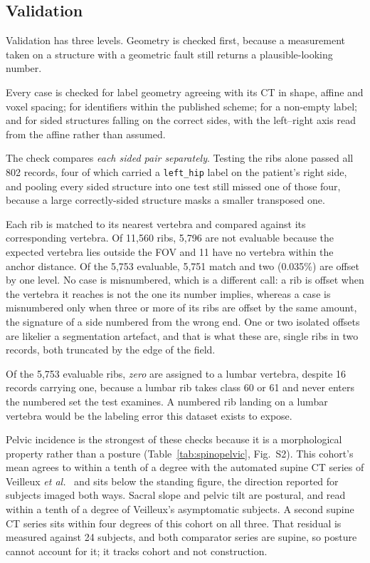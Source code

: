 \documentclass[aapm,mph,amsmath,amssymb,preprint,linenumbers]{revtex4-2}
\begin{document}
\subsection{Validation}
\label{sec:validation}


Validation has three levels. Geometry is checked first, because a measurement taken on a
structure with a geometric fault still returns a plausible-looking number.

Every case is checked for label geometry agreeing with its CT in
shape, affine and voxel spacing; for identifiers within the published scheme; for a non-empty
label; and for sided structures falling on the correct sides, with the left--right axis read
from the affine rather than assumed. 

The check compares \emph{each sided pair separately}. Testing the ribs alone passed all 802
records, four of which carried a \texttt{left\_hip} label on the patient's right side, and
pooling every sided structure into one test still missed one of those four, because a large
correctly-sided structure masks a smaller transposed one.

Each rib is matched to its nearest vertebra and compared
against its corresponding vertebra. Of 11{,}560 ribs, 5{,}796 are not evaluable
because the expected vertebra lies outside the FOV and 11 have no vertebra within
the anchor distance. Of the 5{,}753 evaluable, 5{,}751 match and two (0.035\%) are offset by
one level. No case is misnumbered,
which is a different call: a rib is offset when the vertebra it reaches is not the one its
number implies, whereas a case is misnumbered only when three or more of its ribs are offset by
the same amount, the signature of a side numbered from the wrong end. One or two isolated
offsets are likelier a segmentation artefact, and that is what these are, single ribs in two
records, both truncated by the edge of the field.

Of the 5{,}753 evaluable ribs, \emph{zero} are assigned to a lumbar vertebra, despite 16 records
carrying one, because a lumbar rib takes class 60 or 61 and never enters the numbered set the
test examines. A numbered rib landing on a lumbar vertebra would be the labeling error this
dataset exists to expose.

Pelvic incidence is the strongest of these checks
because it is a morphological property rather than a posture (Table~\ref{tab:spinopelvic},
Fig.~S2). This cohort's mean agrees to
within a tenth of a degree with the automated supine CT series of Veilleux \emph{et
al.}~\cite{veilleux2020} and sits below the standing figure, the direction reported for subjects
imaged both ways.\cite{leeliu2022} Sacral slope and pelvic tilt are postural, and read within a tenth of a degree of Veilleux's asymptomatic subjects. A second supine CT series sits
within four degrees of this cohort on all three.\cite{hasegawa2018} That residual is measured against 24 subjects, and both comparator
series are supine, so posture cannot account for it; it tracks cohort and not construction.
\end{document}
